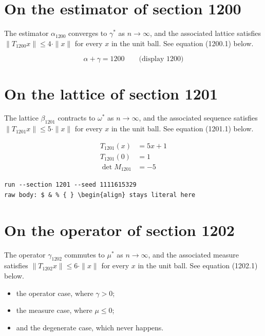 \documentclass{article}
\begin{document}
\section{On the estimator of section 1200}
The estimator $\alpha_{1200}$ converges to $\gamma^{*}$ as $n \to \infty$,
and the associated lattice satisfies $\|T_{1200} x\| \leq 4 \cdot \|x\|$
for every $x$ in the unit ball. See equation (1200.1) below.

$$
\alpha + \gamma = 1200 \qquad \text{(display 1200)}
$$

\section{On the lattice of section 1201}
The lattice $\beta_{1201}$ contracts to $\omega^{*}$ as $n \to \infty$,
and the associated sequence satisfies $\|T_{1201} x\| \leq 5 \cdot \|x\|$
for every $x$ in the unit ball. See equation (1201.1) below.

\begin{align}
T_{1201}(x) &= 5 x + 1 \\
T_{1201}(0) &= 1 \\
\det M_{1201} &= -5
\end{align}

\begin{verbatim}
run --section 1201 --seed 1111615329
raw body: $ & % { } \begin{align} stays literal here
\end{verbatim}

\section{On the operator of section 1202}
The operator $\gamma_{1202}$ commutes to $\mu^{*}$ as $n \to \infty$,
and the associated measure satisfies $\|T_{1202} x\| \leq 6 \cdot \|x\|$
for every $x$ in the unit ball. See equation (1202.1) below.

\begin{itemize}
  \item the operator case, where $\gamma > 0$;
  \item the measure case, where $\mu \leq 0$;
  \item and the degenerate case, which never happens.
\end{itemize}
\end{document}
